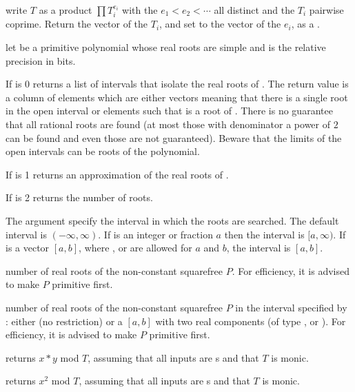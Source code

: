  write $T$ as a product $\prod T_i^{e_i}$
with the $e_1 < e_2 < \cdots$ all distinct and the $T_i$ pairwise coprime.
Return the vector of the $T_i$, and set  to the vector of the $e_i$,
as a .

 let  be a
primitive  polynomial whose real roots are simple and  is
the relative precision in bits.

\item If  is 0 returns a list of intervals that isolate the real
roots of . The return value is a column of elements which are either
vectors \kbd{[a,b]} meaning that there is a single root in the open interval
 or elements  such that  is a root of .
There is no guarantee that all rational roots are found (at most those with
denominator a power of $2$ can be found and even those are not guaranteed).
Beware that the limits of the open intervals can be roots of the polynomial.

\item If  is 1 returns an approximation of the real roots of .

\item If  is 2 returns the number of roots.

The argument  specify the interval in which the roots
are searched. The default interval is $(-\infty,\infty)$. If  is an
integer or fraction $a$ then the interval is $[a,\infty)$. If  is
a vector $[a,b]$, where ,  or  are allowed
for $a$ and $b$, the interval is $[a,b]$.

 number of real roots of the non-constant
squarefree  $P$. For efficiency, it is advised to make $P$ primitive
first.

 number of real roots of the
non-constant squarefree  $P$ in the interval specified by :
either  (no restriction) or a  $[a,b]$ with two real
components (of type ,  or ). For efficiency,
it is advised to make $P$ primitive first.


 returns $x*y$ mod $T$, assuming
that all inputs are s and that $T$ is monic.

 returns $x^2$ mod $T$, assuming
that all inputs are s and that $T$ is monic.

